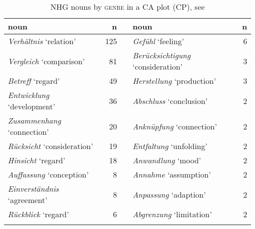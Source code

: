 \documentclass[output=paper,colorlinks,citecolor=brown]{langscibook}
\begin{document}
\begin{table}
\begin{tabularx}{\textwidth}{lr X lr}
\lsptoprule
{noun} &  n && noun & n\\
\midrule
\textit{Verhältnis} ‘relation'  & 125  &&      \textit{Gefühl} ‘feeling'  & 6\\
\textit{Vergleich} ‘comparison'  & 81  &&      \textit{Berücksichtigung} ‘consideration'  & 3\\
\textit{Betreff} ‘regard'  & 49  &&            \textit{Herstellung} ‘production'  & 3\\
\textit{Entwicklung} ‘development'  & 36  &&   \textit{Abschluss} ‘conclusion'  & 2\\
\textit{Zusammenhang} ‘connection'  & 20  &&   \textit{Anknüpfung} ‘connection'  & 2\\
\textit{Rücksicht} ‘consideration'  & 19  &&   \textit{Entfaltung} ‘unfolding'  & 2\\
\textit{Hinsicht} ‘regard'  & 18  &&           \textit{Anwandlung} ‘mood'  & 2\\
\textit{Auffassung} ‘conception'  & 8  &&      \textit{Annahme} ‘assumption'  & 2\\
\textit{Einverständnis} ‘agreement'  & 8  &&   \textit{Anpassung} ‘adaption'  & 2\\
\textit{Rückblick} ‘regard'  & 6  &&           \textit{Abgrenzung} ‘limitation' & 2\\
\lspbottomrule
\end{tabularx}
\caption{NHG nouns by \textsc{genre} \textup{in a CA plot (CP)}, see }
\label{tab:fleissner:tofig8}
\end{table}
\end{document}
